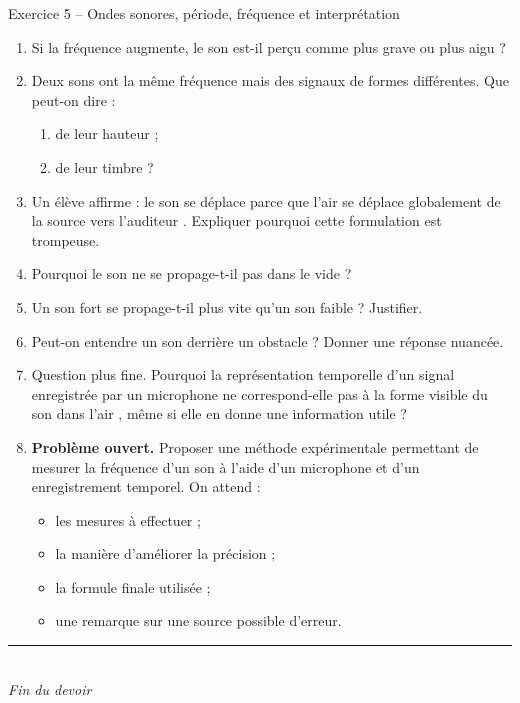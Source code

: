 \documentclass[11pt,a4paper]{article}
\begin{document}
\begin{exobox}{Exercice 5 -- Ondes sonores, période, fréquence et interprétation}
\begin{enumerate}[label=\textbf{\arabic*.}]
    \item Si la fréquence augmente, le son est-il perçu comme plus grave ou plus aigu ?

    \item Deux sons ont la même fréquence mais des signaux de formes différentes.  
    Que peut-on dire :
    \begin{enumerate}[label=\alph*)]
        \item de leur hauteur ;
        \item de leur timbre ?
    \end{enumerate}

    \item Un élève affirme : \og le son se déplace parce que l’air se déplace globalement de la source vers l’auditeur \fg.  
    Expliquer pourquoi cette formulation est trompeuse.

    \item Pourquoi le son ne se propage-t-il pas dans le vide ?

    \item Un son fort se propage-t-il plus vite qu’un son faible ? Justifier.

    \item Peut-on entendre un son derrière un obstacle ? Donner une réponse nuancée.

    \item Question plus fine.  
    Pourquoi la représentation temporelle d’un signal enregistrée par un microphone ne correspond-elle pas à \og la forme visible du son dans l’air \fg, même si elle en donne une information utile ?

    \item \textbf{Problème ouvert.}  
    Proposer une méthode expérimentale permettant de mesurer la fréquence d’un son à l’aide d’un microphone et d’un enregistrement temporel.  
    On attend :
    \begin{itemize}
        \item les mesures à effectuer ;
        \item la manière d’améliorer la précision ;
        \item la formule finale utilisée ;
        \item une remarque sur une source possible d’erreur.
    \end{itemize}
\end{enumerate}
\end{exobox}

\vfill
\begin{center}
    \rule{0.5\linewidth}{0.5pt}\\
    \textit{Fin du devoir}
\end{center}
\end{document}
